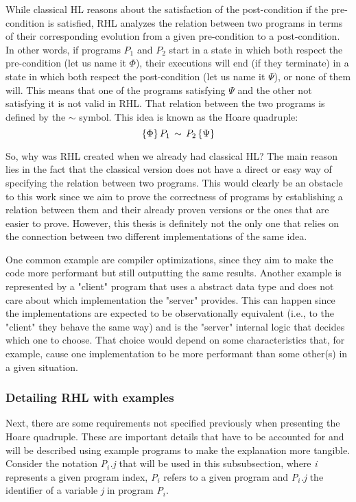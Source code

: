 While classical HL reasons about the satisfaction of the post-condition if the pre-condition is satisfied, RHL analyzes the relation between two programs in terms of their corresponding evolution from a given pre-condition to a post-condition.
In other words, if programs \emph{$P_1$} and \emph{$P_2$} start in a state in which both respect the pre-condition (let us name it $\Phi$), their executions will end (if they terminate) in a state in which both respect the post-condition (let us name it $\Psi$), or none of them will.
This means that one of the programs satisfying $\Psi$ and the other not satisfying it is not valid in RHL.
That relation between the two programs is defined by the $\sim$ symbol.
This idea is known as the Hoare quadruple:
\[ \{\Phi\} \, \emph{$P_1$} \, \sim \, \emph{$P_2$} \, \{\Psi\} \]

So, why was RHL created when we already had classical HL? 
The main reason lies in the fact that the classical version does not have a direct or easy way of specifying the relation between two programs. 
This would clearly be an obstacle to this work since we aim to prove the correctness of programs by establishing a relation between them and their already proven versions or the ones that are easier to prove.
However, this thesis is definitely not the only one that relies on the connection between two different implementations of the same idea.

One common example are compiler optimizations, since they aim to make the code more performant but still outputting the same results.
Another example is represented by a "client" program that uses a abstract data type and does not care about which implementation the "server" provides.
This can happen since the implementations are expected to be observationally equivalent (i.e., to the "client" they behave the same way) and is the "server" internal logic that decides which one to choose.
That choice would depend on some characteristics that, for example, cause one implementation to be more performant than some other(s) in a given situation.


\subsubsection{Detailing RHL with examples}
\label{sub:relational_hoare_logic_examples}

Next, there are some requirements not specified previously when presenting the Hoare quadruple.
These are important details that have to be accounted for and will be described using example programs to make the explanation more tangible.
Consider the notation \emph{P$_i$.j} that will be used in this subsubsection, where \emph{i} represents a given program index, \emph{P$_i$} refers to a given program and \emph{P$_i$.j} the identifier of a variable \emph{j} in program \emph{P$_i$}.

